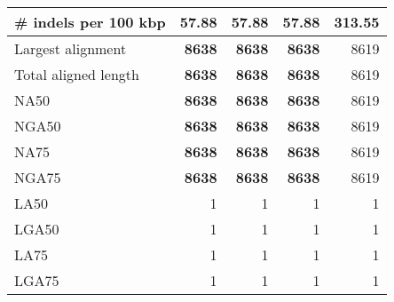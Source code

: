 \documentclass[12pt,a4paper]{article}
\begin{document}
\begin{table}[ht]
\begin{center}
\begin{tabular}{|l*{4}{|r}|}
\# indels per 100 kbp & {\bf 57.88} & {\bf 57.88} & {\bf 57.88} & 313.55 \\ \hline
Largest alignment & {\bf 8638} & {\bf 8638} & {\bf 8638} & 8619 \\ \hline
Total aligned length & {\bf 8638} & {\bf 8638} & {\bf 8638} & 8619 \\ \hline
NA50 & {\bf 8638} & {\bf 8638} & {\bf 8638} & 8619 \\ \hline
NGA50 & {\bf 8638} & {\bf 8638} & {\bf 8638} & 8619 \\ \hline
NA75 & {\bf 8638} & {\bf 8638} & {\bf 8638} & 8619 \\ \hline
NGA75 & {\bf 8638} & {\bf 8638} & {\bf 8638} & 8619 \\ \hline
LA50 & 1 & 1 & 1 & 1 \\ \hline
LGA50 & 1 & 1 & 1 & 1 \\ \hline
LA75 & 1 & 1 & 1 & 1 \\ \hline
LGA75 & 1 & 1 & 1 & 1 \\ \hline
\end{tabular}
\end{center}
\end{table}
\end{document}
